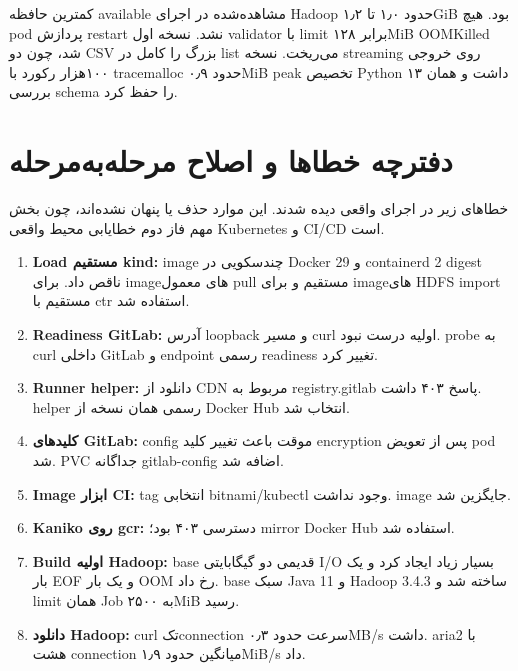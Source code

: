 \documentclass[12pt,a4paper]{article}
\newcommand{\codefile}[1]{\lr{\nolinkurl{#1}}}
\begin{document}
کمترین حافظه available مشاهده‌شده در اجرای Hadoop حدود ۱٫۰ تا ۱٫۲GiB بود.
هیچ pod پردازش restart نشد. نسخه اول validator با limit برابر ۱۲۸MiB
OOMKilled شد، چون دو CSV بزرگ را کامل در list می‌ریخت. نسخه streaming روی
خروجی ۱۰۰هزار رکورد با tracemalloc حدود ۰٫۹MiB peak تخصیص Python داشت و همان
۱۳ بررسی schema را حفظ کرد.

\section{دفترچه خطاها و اصلاح مرحله‌به‌مرحله}

خطاهای زیر در اجرای واقعی دیده شدند. این موارد حذف یا پنهان نشده‌اند، چون بخش
مهم فاز دوم خطایابی محیط واقعی Kubernetes و CI/CD است.

\begin{enumerate}
  \item \textbf{Load مستقیم kind:} image چندسکویی در Docker 29 و containerd 2
  digest ناقص داد. برای imageهای معمول pull مستقیم و برای imageهای HDFS import
  مستقیم با ctr استفاده شد.

  \item \textbf{Readiness GitLab:} آدرس loopback و مسیر curl اولیه درست نبود.
  probe به curl داخلی GitLab و endpoint رسمی readiness تغییر کرد.

  \item \textbf{Runner helper:} دانلود از CDN مربوط به registry.gitlab پاسخ
  ۴۰۳ داشت. helper رسمی همان نسخه از Docker Hub انتخاب شد.

  \item \textbf{کلیدهای GitLab:} config موقت باعث تغییر کلید encryption پس از
  تعویض pod شد. PVC جداگانه gitlab-config اضافه شد.

  \item \textbf{Image ابزار CI:} tag انتخابی bitnami/kubectl وجود نداشت.
  image \codefile{alpine/k8s:1.32.3} جایگزین شد.

  \item \textbf{Kaniko روی gcr:} دسترسی ۴۰۳ بود؛ mirror Docker Hub استفاده شد.

  \item \textbf{Build اولیه Hadoop:} base قدیمی دو گیگابایتی I/O بسیار زیاد
  ایجاد کرد و یک بار EOF و یک بار OOM رخ داد. base سبک Java 11 و Hadoop 3.4.3
  ساخته شد و limit همان Job به ۲۵۰۰MiB رسید.

  \item \textbf{دانلود Hadoop:} curl تک‌connection سرعت حدود ۰٫۳MB/s داشت.
  aria2 با هشت connection میانگین حدود ۱٫۹MiB/s داد.


\end{enumerate}
\end{document}
